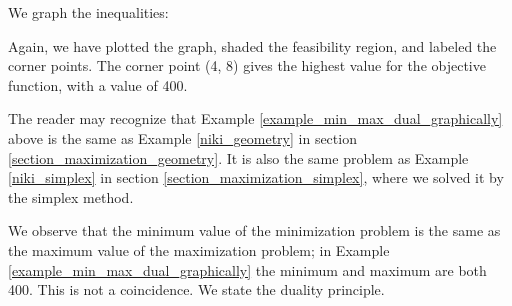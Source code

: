 \begin{solution}
    We graph the inequalities:
    \begin{center}
    \end{center}

    Again, we have plotted the graph, shaded the feasibility region, and labeled the corner points. The corner point (4, 8) gives the highest value for the objective function, with a value of 400.
\end{solution}

The reader may recognize that Example \ref{example_min_max_dual_graphically} above is the same as Example \ref{niki_geometry} in section \ref{section_maximization_geometry}. It is also the same problem as Example \ref{niki_simplex} in section \ref{section_maximization_simplex}, where we solved it by the simplex method.

We observe that the minimum value of the minimization problem is the same as the maximum value of the maximization problem; in Example \ref{example_min_max_dual_graphically} the minimum and maximum are both 400. This is not a coincidence. We state the duality principle.

